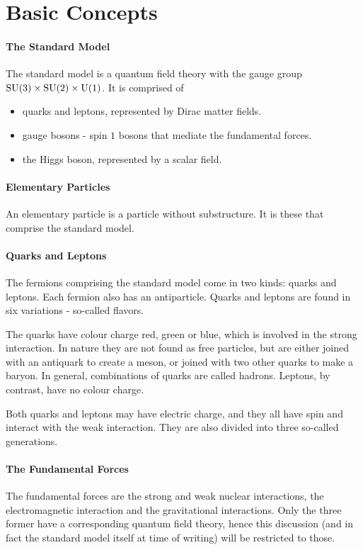 \section{Basic Concepts}

\paragraph{The Standard Model}
The standard model is a quantum field theory with the gauge group $\text{SU}(3)\times\text{SU}(2)\times\text{U}(1)$. It is comprised of
\begin{itemize}
	\item quarks and leptons, represented by Dirac matter fields.
	\item gauge bosons - spin $1$ bosons that mediate the fundamental forces.
	\item the Higgs boson, represented by a scalar field.
\end{itemize}

\paragraph{Elementary Particles}
An elementary particle is a particle without substructure. It is these that comprise the standard model.

\paragraph{Quarks and Leptons}
The fermions comprising the standard model come in two kinds: quarks and leptons. Each fermion also has an antiparticle. Quarks and leptons are found in six variations - so-called flavors.

The quarks have colour charge red, green or blue, which is involved in the strong interaction. In nature they are not found as free particles, but are either joined with an antiquark to create a meson, or joined with two other quarks to make a baryon. In general, combinations of quarks are called hadrons. Leptons, by contrast, have no colour charge.

Both quarks and leptons may have electric charge, and they all have spin and interact with the weak interaction. They are also divided into three so-called generations.

\paragraph{The Fundamental Forces}
The fundamental forces are the strong and weak nuclear interactions, the electromagnetic interaction and the gravitational interactions. Only the three former have a corresponding quantum field theory, hence this discussion (and in fact the standard model itself at time of writing) will be restricted to those.

